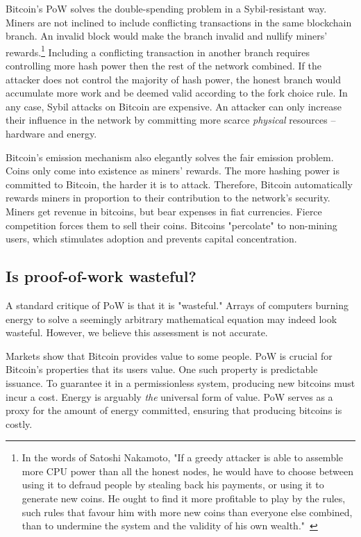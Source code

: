 Bitcoin's PoW solves the double-spending problem in a Sybil-resistant way.
Miners are not inclined to include conflicting transactions in the same blockchain branch.
An invalid block would make the branch invalid and nullify miners' rewards.\footnote{In the words of Satoshi Nakamoto, "If a greedy attacker is able to assemble more CPU power than all the honest nodes, he would have to choose between using it to defraud people by stealing back his payments, or using it to generate new coins. He ought to find it more profitable to play by the rules, such rules that favour him with more new coins than everyone else combined, than to undermine the system and the validity of his own wealth."~\cite{nakamoto2008bitcoin}}
Including a conflicting transaction in another branch requires controlling more hash power then the rest of the network combined.
If the attacker does not control the majority of hash power, the honest branch would accumulate more work and be deemed valid according to the fork choice rule.
In any case, Sybil attacks on Bitcoin are expensive.
An attacker can only increase their influence in the network by committing more scarce \textit{physical} resources -- hardware and energy.

Bitcoin's emission mechanism also elegantly solves the fair emission problem.
Coins only come into existence as miners' rewards.
The more hashing power is committed to Bitcoin, the harder it is to attack.
Therefore, Bitcoin automatically rewards miners in proportion to their contribution to the network's security.
Miners get revenue in bitcoins, but bear expenses in fiat currencies.
Fierce competition forces them to sell their coins.
Bitcoins "percolate" to non-mining users, which stimulates adoption and prevents capital concentration.


\subsection{Is proof-of-work wasteful?}

A standard critique of PoW is that it is "wasteful."
Arrays of computers burning energy to solve a seemingly arbitrary mathematical equation may indeed look wasteful.
However, we believe this assessment is not accurate.

Markets show that Bitcoin provides value to some people.
PoW is crucial for Bitcoin's properties that its users value.
One such property is predictable issuance.
To guarantee it in a permissionless system, producing new bitcoins must incur a cost.
Energy is arguably \textit{the} universal form of value.
PoW serves as a proxy for the amount of energy committed, ensuring that producing bitcoins is costly.


